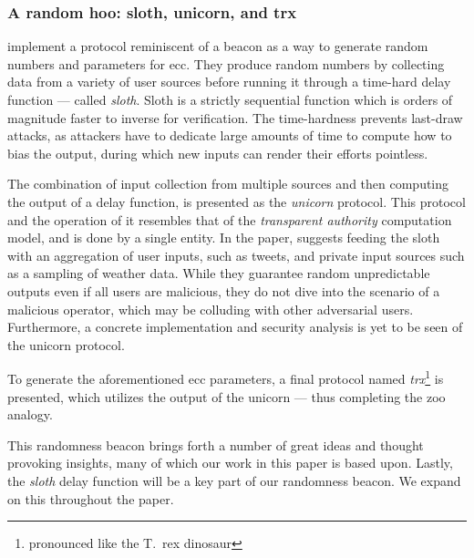 \subsubsection{A random hoo: sloth, unicorn, and trx}%
\label{sub:random_zoo}
\citet{randomzoo} implement a protocol reminiscent of a beacon as a way to generate random numbers and parameters for \gls{ecc}.
They produce random numbers by collecting data from a variety of user sources before running it through a time-hard delay function --- called \textit{sloth}.
Sloth is a strictly sequential function which is orders of magnitude faster to inverse for verification.
The time-hardness prevents last-draw attacks, as attackers have to dedicate large amounts of time to compute how to bias the output, during which new inputs can render their efforts pointless.

The combination of input collection from multiple sources and then computing the output of a delay function, is presented as the \textit{unicorn} protocol.
This protocol and the operation of it resembles that of the \emph{transparent authority} computation model, and is done by a single entity.
In the paper, \citeauthor{randomzoo} suggests feeding the sloth with an aggregation of user inputs, such as tweets, and private input sources such as a sampling of weather data.
While they guarantee random unpredictable outputs even if all users are malicious, they do not dive into the scenario of a malicious operator, which may be colluding with other adversarial users.
Furthermore, a concrete implementation and security analysis is yet to be seen of the unicorn protocol.

To generate the aforementioned \gls{ecc} parameters, a final protocol named \textit{trx}\footnote{pronounced like the T.\ rex dinosaur} is presented, which utilizes the output of the unicorn --- thus completing the zoo analogy.

This randomness beacon brings forth a number of great ideas and thought provoking insights, many of which our work in this paper is based upon.
Lastly, the \emph{sloth} delay function will be a key part of our randomness beacon.
We expand on this throughout the paper.

